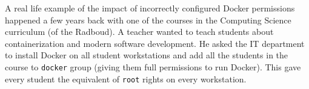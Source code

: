 \hfill

A real life example of the impact of incorrectly configured Docker permissions happened a few years back with one of the courses in the Computing Science curriculum (of the Radboud). A teacher wanted to teach students about containerization and modern software development. He asked the IT department to install Docker on all student workstations and add all the students in the course to \lstinline{docker} group (giving them full permissions to run Docker). This gave every student the equivalent of \lstinline{root} rights on every workstation.
